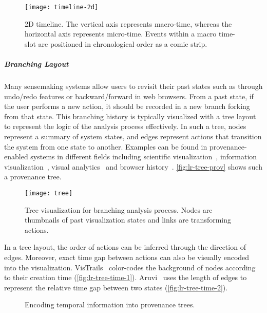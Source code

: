 \begin{figure}[!htb]
	\centering
	\texttt{[image: timeline-2d]}
	\caption{2D timeline. The vertical axis represents macro-time, whereas the horizontal axis represents micro-time. Events within a macro time-slot are positioned in chronological order as a comic strip. }
	\label{fig:lr-timeline-2d}
\end{figure}

\subparagraph{Branching Layout}
Many sensemaking systems allow users to revisit their past states such as through undo/redo features or backward/forward in web browsers. From a past state, if the user performs a new action, it should be recorded in a new branch forking from that state. This branching history is typically visualized with a tree layout to represent the logic of the analysis process effectively. In such a tree, nodes represent a summary of system states, and edges represent actions that transition the system from one state
to another. Examples can be found in provenance-enabled systems in different fields including scientific visualization~\cite{Ma1999}, information visualization~\cite{Dunne2012}, visual analytics~\cite{Kadivar2009} and browser history~\cite{Ayers1995}. \autoref{fig:lr-tree-prov} shows such a provenance tree.

\begin{figure}[!htb]
	\centering
	\texttt{[image: tree]}
	\caption{Tree visualization for branching analysis process. Nodes are thumbnails of past visualization states and links are transforming actions. }
	\label{fig:lr-tree-prov}
\end{figure}

In a tree layout, the order of actions can be inferred through the direction of edges. Moreover, exact time gap between actions can also be visually encoded into the visualization. VisTrails~\cite{Bavoil2005} color-codes the background of nodes according to their creation time (\autoref{fig:lr-tree-time-1}). Aruvi~\cite{Shrinivasan2008} uses the length of edges to represent the relative time gap between two states (\autoref{fig:lr-tree-time-2}). 

\begin{figure}[!htb]
\centering
{} 
\hfill
{}
\caption{Encoding temporal information into provenance trees.}
\end{figure}

